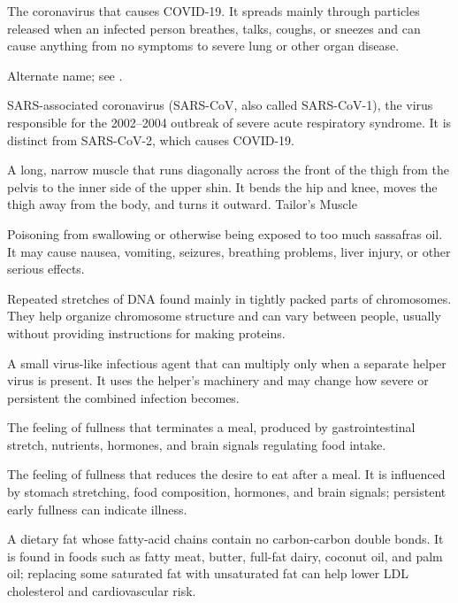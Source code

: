  The coronavirus that causes COVID-19. It spreads mainly through particles released when an infected person breathes, talks, coughs, or sneezes and can cause anything from no symptoms to severe lung or other organ disease.

 Alternate name; see .

 SARS-associated coronavirus (SARS-CoV, also called SARS-CoV-1), the virus responsible for the 2002--2004 outbreak of severe acute respiratory syndrome. It is distinct from SARS-CoV-2, which causes COVID-19.

 A long, narrow muscle that runs diagonally across the front of the thigh from the pelvis to the inner side of the upper shin. It bends the hip and knee, moves the thigh away from the body, and turns it outward.
\synonyms
Tailor's Muscle

 Poisoning from swallowing or otherwise being exposed to too much sassafras oil. It may cause nausea, vomiting, seizures, breathing problems, liver injury, or other serious effects.

 Repeated stretches of DNA found mainly in tightly packed parts of chromosomes. They help organize chromosome structure and can vary between people, usually without providing instructions for making proteins.

 A small virus-like infectious agent that can multiply only when a separate helper virus is present. It uses the helper’s machinery and may change how severe or persistent the combined infection becomes.

 The feeling of fullness that terminates a meal, produced by gastrointestinal stretch, nutrients, hormones, and brain signals regulating food intake.

 The feeling of fullness that reduces the desire to eat after a meal. It is influenced by stomach stretching, food composition, hormones, and brain signals; persistent early fullness can indicate illness.

 A dietary fat whose fatty-acid chains contain no carbon-carbon double bonds. It is found in foods such as fatty meat, butter, full-fat dairy, coconut oil, and palm oil; replacing some saturated fat with unsaturated fat can help lower LDL cholesterol and cardiovascular risk.

